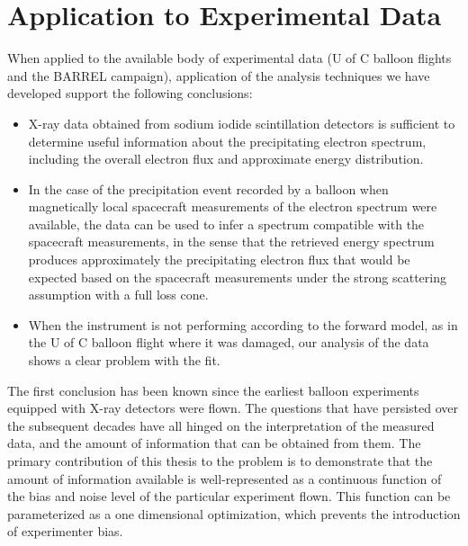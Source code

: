 \section{Application to Experimental Data}

When applied to the available body of experimental data (U of C balloon flights and the BARREL campaign), application of the analysis techniques we have developed support the following conclusions:

\begin{itemize}
\item X-ray data obtained from sodium iodide scintillation detectors is sufficient to determine useful information about the precipitating electron spectrum, including the overall electron flux and approximate energy distribution. 
\item In the case of the precipitation event recorded by a balloon when magnetically local spacecraft measurements of the electron spectrum were available, the data can be used to infer a spectrum compatible with the spacecraft measurements, in the sense that the retrieved energy spectrum produces approximately the precipitating electron flux that would be expected based on the spacecraft measurements under the strong scattering assumption with a full loss cone.
\item When the instrument is not performing according to the forward model, as in the U of C balloon flight where it was damaged, our analysis of the data shows a clear problem with the fit. 
\end{itemize}


The first conclusion has been known since the earliest balloon experiments equipped with X-ray detectors were flown. The questions that have persisted over the subsequent decades have all hinged on the interpretation of the measured data, and the amount of information that can be obtained from them. The primary contribution of this thesis to the problem is to demonstrate  that the amount of information available is well-represented as a continuous function of the bias and noise level of the particular experiment flown. This function can be parameterized as a one dimensional optimization, which prevents the introduction of experimenter bias. 

